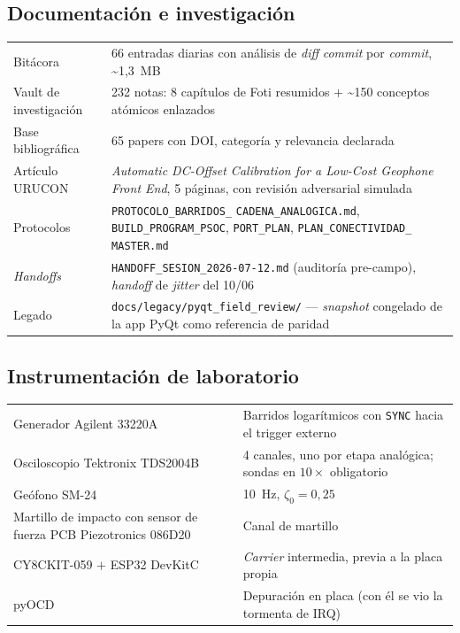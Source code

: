 \subsection{Documentaci\'on e investigaci\'on}

\begin{center}\small
\begin{tabularx}{\textwidth}{@{}l X@{}}
\toprule
Bit\'acora & 66 entradas diarias con an\'alisis de \emph{diff} \emph{commit} por \emph{commit}, \textasciitilde{}1{,}3~MB \\
Vault de investigaci\'on & 232 notas: 8 cap\'itulos de Foti resumidos $+$ \textasciitilde{}150 conceptos at\'omicos enlazados \\
Base bibliogr\'afica & 65 papers con DOI, categor\'ia y relevancia declarada \\
Art\'iculo URUCON & \emph{Automatic DC-Offset Calibration for a Low-Cost Geophone Front End}, 5 p\'aginas, con revisi\'on adversarial simulada \\
Protocolos & \texttt{PROTOCOLO\_BARRIDOS\_} \texttt{CADENA\_ANALOGICA.md}, \texttt{BUILD\_PROGRAM\_PSOC}, \texttt{PORT\_PLAN}, \texttt{PLAN\_CONECTIVIDAD\_} \texttt{MASTER.md} \\
\emph{Handoffs} & \texttt{HANDOFF\_SESION\_2026-07-12.md} (auditor\'ia pre-campo), \emph{handoff} de \emph{jitter} del 10/06 \\
Legado & \texttt{docs/legacy/pyqt\_field\_review/} --- \emph{snapshot} congelado de la app PyQt como referencia de paridad \\
\bottomrule
\end{tabularx}
\end{center}

\subsection{Instrumentaci\'on de laboratorio}

\begin{center}\small
\begin{tabularx}{\textwidth}{@{}l X@{}}
\toprule
Generador Agilent 33220A & Barridos logar\'itmicos con \texttt{SYNC} hacia el trigger externo \\
Osciloscopio Tektronix TDS2004B & 4 canales, uno por etapa anal\'ogica; sondas en $10\times$ obligatorio \\
Ge\'ofono SM-24 & \SI{10}{\hertz}, $\zeta_0 = 0{,}25$ \\
Martillo de impacto con sensor de fuerza PCB Piezotronics 086D20 & Canal de martillo \\
CY8CKIT-059 $+$ ESP32 DevKitC & \emph{Carrier} intermedia, previa a la placa propia \\
pyOCD & Depuraci\'on en placa (con \'el se vio la tormenta de IRQ) \\
\bottomrule
\end{tabularx}
\end{center}
